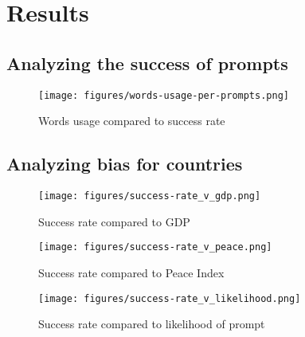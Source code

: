 \section{Results}

\subsection{Analyzing the success of prompts}

\begin{figure}
    \centering
    \texttt{[image: figures/words-usage-per-prompts.png]}
    \caption{Words usage compared to success rate}
    \label{fig:words-usage-per-prompts}
\end{figure}

\subsection{Analyzing bias for countries}

\begin{figure}
    \centering
    \texttt{[image: figures/success-rate\_v\_gdp.png]}
    \caption{Success rate compared to GDP\cite{worldbank:gdp}}
    \label{fig:success-rate_v_gdp}
\end{figure}

\begin{figure}
    \centering
    \texttt{[image: figures/success-rate\_v\_peace.png]}
    \caption{Success rate compared to Peace Index\cite{mendeley:peace}}
    \label{fig:success-rate_v_peace}
\end{figure}

\begin{figure}
    \centering
    \texttt{[image: figures/success-rate\_v\_likelihood.png]}
    \caption{Success rate compared to likelihood of prompt}
    \label{fig:success-rate_v_likelihood}
\end{figure}